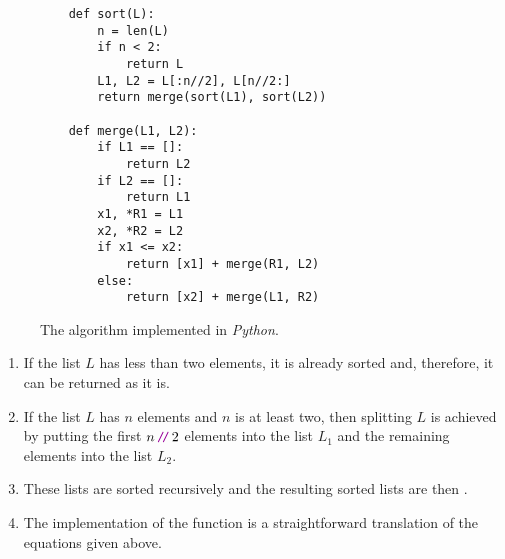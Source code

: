 \begin{figure}[!ht]
  \centering
\begin{verbatim}
    def sort(L):
        n = len(L)
        if n < 2:
            return L
        L1, L2 = L[:n//2], L[n//2:]
        return merge(sort(L1), sort(L2))
    
    def merge(L1, L2):
        if L1 == []:
            return L2
        if L2 == []:
            return L1
        x1, *R1 = L1
        x2, *R2 = L2
        if x1 <= x2:
            return [x1] + merge(R1, L2)
        else:
            return [x2] + merge(L1, R2)
\end{verbatim}
\vspace*{-0.3cm}
  \caption{The  algorithm implemented in \textsl{Python}.}
  \label{fig:merge-sort.stlx}
\end{figure}
\begin{enumerate}
\item If the list $L$ has less than two elements, it is already sorted and, therefore, it
      can be returned as it is.
\item If the list $L$ has $n$ elements and $n$ is at least two, then splitting $L$ is achieved by putting the
      first $n\dv 2$ 
      elements into the list $L_1$ and the remaining elements into the list $L_2$.
\item These lists are sorted recursively and the resulting sorted lists are then .
\item The implementation of the function  is a straightforward translation of the equations
      given above.
\end{enumerate}

